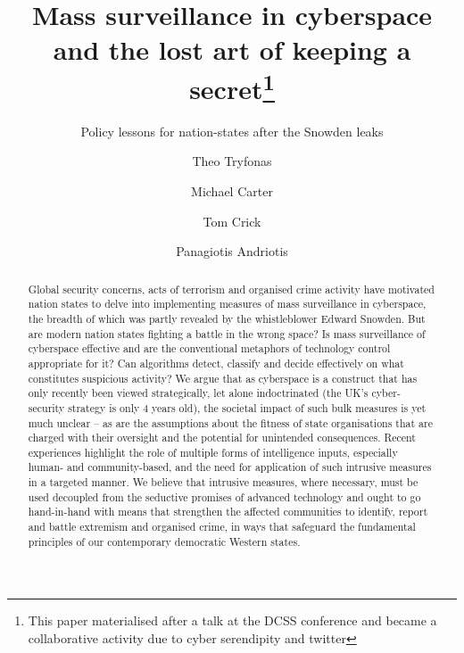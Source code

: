 \documentclass{llncs}
\begin{document}
\title{Mass surveillance in cyberspace and the lost art of keeping a secret\thanks{This paper materialised after a talk at the DCSS conference and became a collaborative activity due to cyber serendipity and twitter}}
\subtitle{Policy lessons for nation-states after the Snowden leaks}

\author{Theo Tryfonas \and Michael Carter \and Tom Crick \and Panagiotis Andriotis}

\maketitle

\begin{abstract}
Global security concerns, acts of terrorism and organised crime activity have motivated nation states to delve into implementing measures of mass surveillance in cyberspace, the breadth of which was partly revealed by the whistleblower Edward Snowden. But are modern nation states fighting a battle in the wrong space? Is mass surveillance of cyberspace effective and are the conventional metaphors of technology control appropriate for it? Can algorithms detect, classify and decide effectively on what constitutes suspicious activity? We argue that as cyberspace is a construct that has only recently been viewed strategically, let alone indoctrinated (the UK’s cyber-security strategy is only 4 years old), the societal impact of such bulk measures is yet much unclear – as are the assumptions about the fitness of state organisations that are charged with their oversight and the potential for unintended consequences. Recent experiences highlight the role of multiple forms of intelligence inputs, especially human- and community-based, and the need for application of such intrusive measures in a targeted manner. We believe that intrusive measures, where necessary, must be used decoupled from the seductive promises of advanced technology and ought to go hand-in-hand with means that strengthen the affected communities to identify, report and battle extremism and organised crime, in ways that safeguard the fundamental principles of our contemporary democratic Western states.
\end{abstract}
\end{document}
